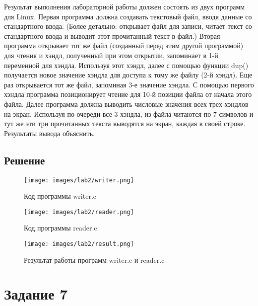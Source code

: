     Результат выполнения лабораторной работы должен состоять из двух программ для Linux. Первая программа должна создавать текстовый файл, вводя данные со стандартного ввода. (Более детально: открывает файл для записи, читает текст со стандартного ввода и выводит этот прочитанный текст в файл.) Вторая программа открывает тот же файл (созданный перед этим другой программой) для чтения и хэндл, полученный при этом открытии, запоминает в 1-й переменной для хэндла. Используя этот хэндл, далее с помощью функции dup() получается новое значение хэндла для доступа к тому же файлу (2-й хэндл). Еще раз открывается тот же файл, запоминая 3-е значение хэндла. С помощью первого хэндла программа позиционирует чтение для 10-й позиции файла от начала этого файла. Далее программа должна выводить числовые значения всех трех хэндлов на экран. Используя по очереди все 3 хэндла, из файла читаются по 7 символов и тут же эти три прочитанных текста выводятся на экран, каждая в своей строке. Результаты вывода объяснить.

    \subsection*{Решение}

    \begin{figure}[H]
        \centering
        \texttt{[image: images/lab2/writer.png]}
        \caption{Код программы writer.c}
    \end{figure}

    \begin{figure}[H]
        \centering
        \texttt{[image: images/lab2/reader.png]}
        \caption{Код программы reader.c}
    \end{figure}

    \begin{figure}[H]
        \centering
        \texttt{[image: images/lab2/result.png]}
        \caption{Результат работы программ writer.c и reader.c}
    \end{figure}

    \newpage

    \section*{Задание 7}

